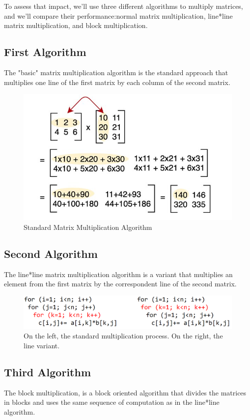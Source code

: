 \documentclass[10pt, titlepage]{extarticle}
\begin{document}
To assess that impact, we'll use three different algorithms to multiply matrices, and we'll compare their performance:normal matrix multiplication, line*line matrix multiplication, and block multiplication.

\subsection{First Algorithm}\label{First Algorithm}

The "basic" matrix multiplication algorithm is the standard approach that multiplies one line of the first matrix by each column of the second matrix.


\begin{figure}[H]
    \centering
    \includegraphics[width=0.4\linewidth]{../misc/main-qimg-9f4bc453b30ef200197f0a1b894df305-pjlq.jpg}
    \caption{Standard Matrix Multiplication Algorithm}
\end{figure}

\subsection{Second Algorithm}\label{Second Algorithm}

The line*line matrix multiplication algorithm is a variant that multiplies an element from the first matrix by the correspondent line of the second matrix.

\begin{figure}[H]
    \centering
    \includegraphics[width=0.4\linewidth]{../misc/linevsnormal.png}
    \caption{On the left, the standard multiplication process. On the right, the line variant.}
\end{figure}

\subsection{Third Algorithm}\label{Third Algorithm}

The block multiplication, is a block oriented algorithm that divides the matrices in blocks and uses the
same sequence of computation as in the line*line algorithm.
\end{document}
